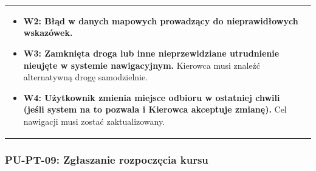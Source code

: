 \documentclass[a4paper,12pt]{article}
\begin{document}
\begin{longtable}{|p{\pierwszakolumnaszerokoscPUTPTNawigacjaDo}|p{\drugakolumnaszerokoscPUTPTNawigacjaDo}|}
\begin{itemize}
            \item \textbf{W2: Błąd w danych mapowych prowadzący do nieprawidłowych wskazówek.}
            \item \textbf{W3: Zamknięta droga lub inne nieprzewidziane utrudnienie nieujęte w systemie nawigacyjnym.} Kierowca musi znaleźć alternatywną drogę samodzielnie.
            \item \textbf{W4: Użytkownik zmienia miejsce odbioru w ostatniej chwili (jeśli system na to pozwala i Kierowca akceptuje zmianę).} Cel nawigacji musi zostać zaktualizowany.
        \end{itemize} \\
\end{longtable}
\endgroup

\subsubsection{PU-PT-09: Zgłaszanie rozpoczęcia kursu}

\begingroup %
\small %
\renewcommand{\arraystretch}{1.2} %

\newlength{\pierwszakolumnaszerokoscPUTPTRozpoczecie}
\setlength{\pierwszakolumnaszerokoscPUTPTRozpoczecie}{4.0cm}

\newlength{\drugakolumnaszerokoscPUTPTRozpoczecie}
\setlength{\drugakolumnaszerokoscPUTPTRozpoczecie}{\dimexpr\textwidth-\pierwszakolumnaszerokoscPUTPTRozpoczecie-2\tabcolsep-3\arrayrulewidth\relax}
\end{document}
